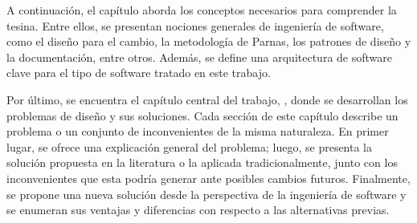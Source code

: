 A continuación, el capítulo  aborda los conceptos necesarios para comprender la tesina. Entre ellos, se presentan nociones generales de ingeniería de software, como el diseño para el cambio, la metodología de Parnas, los patrones de diseño y la documentación, entre otros. Además, se define una arquitectura de software clave para el tipo de software tratado en este trabajo.

Por último, se encuentra el capítulo central del trabajo, , donde se desarrollan los problemas de diseño y sus soluciones. Cada sección de este capítulo describe un problema o un conjunto de inconvenientes de la misma naturaleza. En primer lugar, se ofrece una explicación general del problema; luego, se presenta la solución propuesta en la literatura o la aplicada tradicionalmente, junto con los inconvenientes que esta podría generar ante posibles cambios futuros. Finalmente, se propone una nueva solución desde la perspectiva de la ingeniería de software y se enumeran sus ventajas y diferencias con respecto a las alternativas previas.


